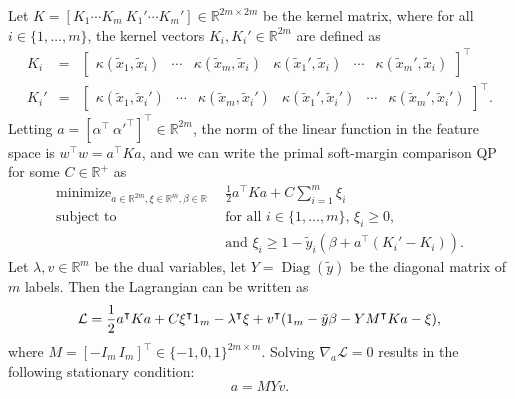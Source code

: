 \documentclass{article}
\newcommand{\RR}{\mathbb R}
\DeclareMathOperator*{\Diag}{Diag}
\DeclareMathOperator*{\minimize}{minimize}
\begin{document}
Let $K=[K_1\cdots K_m\ K_1'\cdots K_m']\in\RR^{2m\times 2m}$ be the
kernel matrix, where for all $i\in\{1, \dots, m\}$, the kernel
vectors $K_i,K_i'\in\RR^{2m}$ are defined as
\begin{eqnarray}
  K_i &=& \left[
    \begin{array}{cccccc}
      \kappa(\tilde x_1, \tilde x_i)&
      \cdots&
      \kappa(\tilde x_m, \tilde x_i)&
      \kappa(\tilde x_1', \tilde x_i)&
      \cdots&
      \kappa(\tilde x_m', \tilde x_i)
    \end{array}
  \right]^\intercal \\
  K_i' &=& \left[
    \begin{array}{cccccc}
      \kappa(\tilde x_1, \tilde x_i')&
      \cdots&
      \kappa(\tilde x_m, \tilde x_i')&
      \kappa(\tilde x_1', \tilde x_i')&
      \cdots&
      \kappa(\tilde x_m', \tilde x_i')
    \end{array}
  \right]^\intercal.
\end{eqnarray}
Letting $a=[\alpha^\intercal\
\alpha'^\intercal]^\intercal\in\RR^{2m}$, the norm of the linear
function in the feature space is $w^\intercal w = a^\intercal K a$,
and we can write the primal soft-margin comparison QP for some
$C\in\RR^+$ as
\begin{equation}
  \begin{aligned}
      \minimize_{a\in\RR^{2m},\xi\in\RR^m,\beta\in\RR}\ \ & 
      \frac 1 2 a^\intercal K a + C\sum_{i=1}^m \xi_i \\
      \text{subject to}\ \ & 
      \text{for all $i\in\{1,\dots,m\}$, }
      \xi_i \geq 0,\\
      &\text{and }
      \xi_i \geq 1-\tilde y_i(\beta + a^\intercal (K_i'-K_i)).
  \end{aligned}
\end{equation}
Let $\lambda, v\in\RR^m$ be the dual variables, let $Y=\Diag(\tilde
y)$ be the diagonal matrix of $m$ labels. Then the Lagrangian can be
written as
\begin{equation}
  \label{eq:lagrangian}
  \mathcal L = \frac 1 2 a^\intercal K a + C\xi^\intercal 1_{m}\\
  -\lambda^\intercal \xi + v^\intercal(1_m - \tilde y\beta - Y M^\intercal K a - \xi),
\end{equation}
where $M=[-I_m \, I_m]^\intercal\in\{-1,0,1\}^{2m\times m}$. Solving
$\nabla_a \mathcal L=0$ results in the following stationary condition:
\begin{equation}
  \label{eq:stationarity}
  a = M Y v.
\end{equation}
\end{document}

